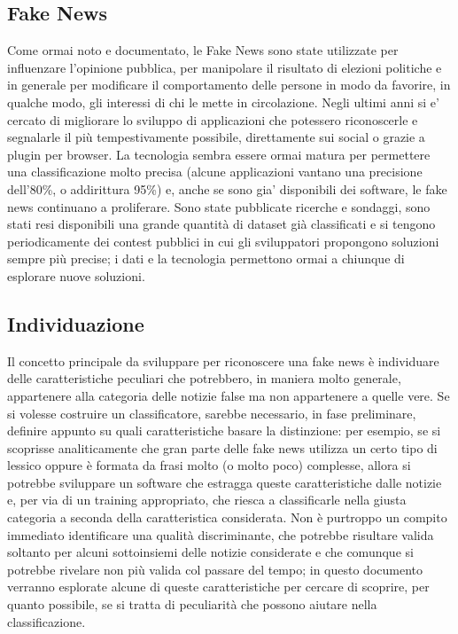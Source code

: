 \documentclass{article}
\begin{document}
	    \newpage
	    
    \begin{multicols}{2}
	    \section{Fake News}
			Come ormai noto e documentato, le Fake News sono state utilizzate per influenzare l'opinione pubblica, per manipolare il risultato di elezioni politiche e in generale per modificare il comportamento delle persone in modo da favorire, in qualche modo, gli interessi di chi le mette in circolazione.
			Negli ultimi anni si e' cercato di migliorare lo sviluppo di applicazioni che potessero riconoscerle e segnalarle il più tempestivamente possibile, direttamente sui social o grazie a plugin per browser. La tecnologia sembra essere ormai matura per permettere una classificazione molto precisa (alcune applicazioni vantano una precisione dell'80\%, o addirittura 95\%) \cite{fakenewschallenge} e, anche se sono gia' disponibili dei software, le fake news continuano a proliferare.
			Sono state pubblicate ricerche e sondaggi, sono stati resi disponibili una grande quantità di dataset già classificati e si tengono periodicamente dei contest pubblici in cui gli sviluppatori propongono soluzioni sempre più precise; i dati e la tecnologia permettono ormai a chiunque di esplorare nuove soluzioni.
			
			\subsection{Individuazione}
			Il concetto principale da sviluppare per riconoscere una fake news è individuare delle caratteristiche peculiari che potrebbero, in maniera molto generale, appartenere alla categoria delle notizie false ma non appartenere a quelle vere. Se si volesse costruire un classificatore, sarebbe necessario, in fase preliminare, definire appunto su quali caratteristiche basare la distinzione: per esempio, se si scoprisse analiticamente che gran parte delle fake news utilizza un certo tipo di lessico oppure è formata da frasi molto (o molto poco) complesse, allora si potrebbe sviluppare un software che estragga queste caratteristiche dalle notizie e, per via di un training appropriato, che riesca a classificarle nella giusta categoria a seconda della caratteristica considerata.
			Non è purtroppo un compito immediato identificare una qualità discriminante, che potrebbe risultare valida soltanto per alcuni sottoinsiemi delle notizie considerate e che comunque si potrebbe rivelare non più valida col passare del tempo; in questo documento verranno esplorate alcune di queste caratteristiche per cercare di scoprire, per quanto possibile, se si tratta di peculiarità che possono aiutare nella classificazione.
	    

\end{multicols}
\end{document}
